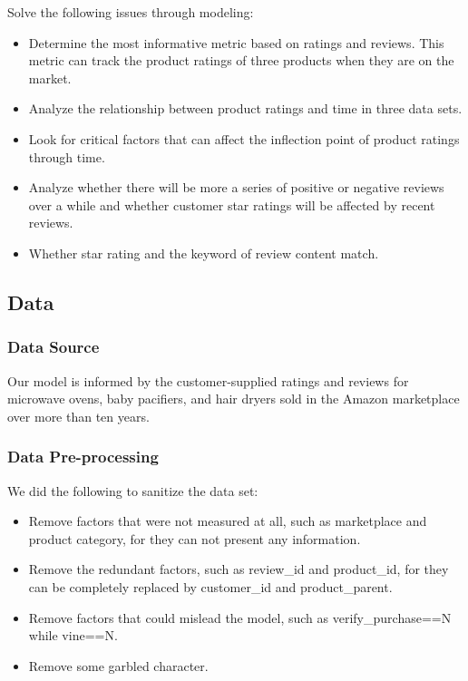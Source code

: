 \documentclass{mcmthesis}
\begin{document}
Solve the following issues through modeling:
\begin{itemize}
  \item Determine the most informative metric based on ratings and reviews. This metric can track the product ratings of three products when they are on the market.
  
  \item Analyze the relationship between product ratings and time in three data sets.
  
  \item Look for critical factors that can affect the inflection point of product ratings through time.
  
  \item Analyze whether there will be more a series of positive or negative reviews over a while and whether customer star ratings will be affected by recent reviews.
  
  \item Whether star rating and the keyword of review content match.
\end{itemize}

\subsection{Data}
\subsubsection{Data Source}
Our model is informed by the customer-supplied ratings and reviews for microwave ovens, baby pacifiers, and hair dryers sold in the Amazon marketplace over more than ten years.
\subsubsection{Data Pre-processing}
We did the following to sanitize the data set:
\begin{itemize}
  \item Remove factors that were not measured at all, such as marketplace and product category, for they can not present any information.
  
  \item Remove the redundant factors, such as review\_id and product\_id, for they can be completely replaced by customer\_id and product\_parent.
  
  \item Remove factors that could mislead the model, such as verify\_purchase==N while vine==N.
  
  \item Remove some garbled character.
\end{itemize}
\end{document}

